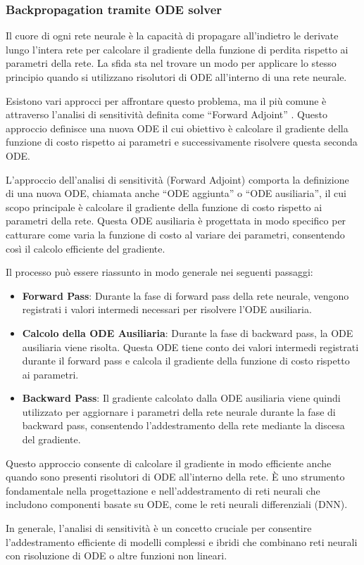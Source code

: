 \subsubsection{Backpropagation tramite ODE solver}

Il cuore di ogni rete neurale è la capacità di propagare all'indietro 
le derivate lungo l'intera rete per calcolare il gradiente della 
funzione di perdita rispetto ai parametri della rete. La sfida sta nel 
trovare un modo per applicare lo stesso principio quando si utilizzano 
risolutori di ODE all'interno di una rete neurale.

Esistono vari approcci per affrontare questo problema, ma il più comune 
è attraverso l'analisi di sensitività definita come ``Forward Adjoint'' \cite{NEURIPS2018_69386f6b} \cite{WANG20131}. Questo approccio 
definisce una nuova ODE il cui obiettivo è calcolare il gradiente della 
funzione di costo rispetto ai parametri e successivamente risolvere 
questa seconda ODE.

L'approccio dell'analisi di sensitività (Forward Adjoint) comporta la 
definizione di una nuova ODE, chiamata anche ``ODE aggiunta'' o 
``ODE ausiliaria'', il cui scopo principale è calcolare il gradiente 
della funzione di costo rispetto ai parametri della rete. 
Questa ODE ausiliaria è progettata in modo specifico per catturare 
come varia la funzione di costo al variare dei parametri, 
consentendo così il calcolo efficiente del gradiente.

Il processo può essere riassunto in modo generale nei seguenti passaggi:

\begin{itemize}
    \item \textbf{Forward Pass}: Durante la fase di forward pass 
    della rete neurale, vengono registrati i valori intermedi 
    necessari per risolvere l'ODE ausiliaria.
    \item \textbf{Calcolo della ODE Ausiliaria}: Durante la fase di 
    backward pass, la ODE ausiliaria viene risolta. 
    Questa ODE tiene conto dei valori intermedi registrati durante 
    il forward pass e calcola il gradiente della funzione di costo 
    rispetto ai parametri.
    \item \textbf{Backward Pass}: Il gradiente calcolato dalla ODE 
    ausiliaria viene quindi utilizzato per aggiornare i parametri 
    della rete neurale durante la fase di backward pass, consentendo 
    l'addestramento della rete mediante la discesa del gradiente.
\end{itemize}

Questo approccio consente di calcolare il gradiente 
in modo efficiente anche quando sono presenti risolutori di ODE 
all'interno della rete. È uno strumento fondamentale nella progettazione 
e nell'addestramento di reti neurali che includono componenti basate 
su ODE, come le reti neurali differenziali (DNN).

In generale, l'analisi di sensitività è un concetto cruciale per 
consentire l'addestramento efficiente di modelli complessi e ibridi 
che combinano reti neurali con risoluzione di ODE o altre funzioni non 
lineari.